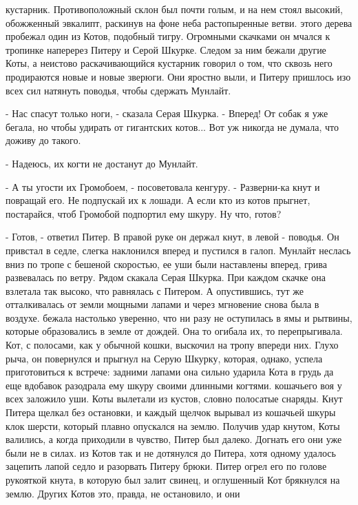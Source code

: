 кустарник. Противоположный склон был почти голым, и на нем стоял 
высокий, обожженный эвкалипт, раскинув на фоне неба растопыренные 
ветви.
 этого дерева пробежал один из Котов, подобный тигру. 
Огромными скачками он мчался к тропинке наперерез Питеру и Серой 
Шкурке. Следом за ним бежали другие Коты, а неистово раскачивающийся 
кустарник говорил о том, что сквозь него продираются новые и новые 
зверюги. Они яростно выли, и Питеру пришлось изо всех сил натянуть 
поводья, чтобы сдержать Мунлайт.
\par- Нас спасут только ноги, - сказала Серая Шкурка. - Вперед! От 
собак я уже бегала, но чтобы удирать от гигантских котов... Вот уж 
никогда не думала, что доживу до такого.
\par- Надеюсь, их когти не достанут до Мунлайт.
\par- А ты угости их Громобоем, - посоветовала кенгуру. - Разверни-ка 
кнут и повращай его. Не подпускай их к лошади. А если кто из котов 
прыгнет, постарайся, чтоб Громобой подпортил ему шкуру. Ну что, готов?
\par- Готов, - ответил Питер. В правой руке он держал кнут, в левой - 
поводья. Он привстал в седле, слегка наклонился вперед и пустился в 
галоп. Мунлайт неслась вниз по тропе с бешеной скоростью, ее уши были 
наставлены вперед, грива развевалась по ветру. Рядом скакала Серая 
Шкурка. При каждом скачке она взлетала так высоко, что равнялась с 
Питером. А опустившись, тут же отталкивалась от земли мощными лапами и 
через мгновение снова была в воздухе.
 бежала настолько уверенно, что ни разу не оступилась в ямы 
и рытвины, которые образовались в земле от дождей. Она то огибала их, 
то перепрыгивала.
 Кот, с полосами, как у обычной кошки, выскочил на тропу 
впереди них. Глухо рыча, он повернулся и прыгнул на Серую Шкурку, 
которая, однако, успела приготовиться к встрече: задними лапами она 
сильно ударила Кота в грудь да еще вдобавок разодрала ему шкуру своими 
длинными когтями.
 кошачьего воя у всех заложило уши. Коты вылетали из кустов, 
словно полосатые снаряды. Кнут Питера щелкал без остановки, и каждый 
щелчок вырывал из кошачьей шкуры клок шерсти, который плавно опускался 
на землю. Получив удар кнутом, Коты валились, а когда приходили в 
чувство, Питер был далеко. Догнать его они уже были не в силах.
 из Котов так и не дотянулся до Питера, хотя одному удалось 
зацепить лапой седло и разорвать Питеру брюки. Питер огрел его по 
голове рукояткой кнута, в которую был залит свинец, и оглушенный Кот 
брякнулся на землю. Других Котов это, правда, не остановило, и они 
